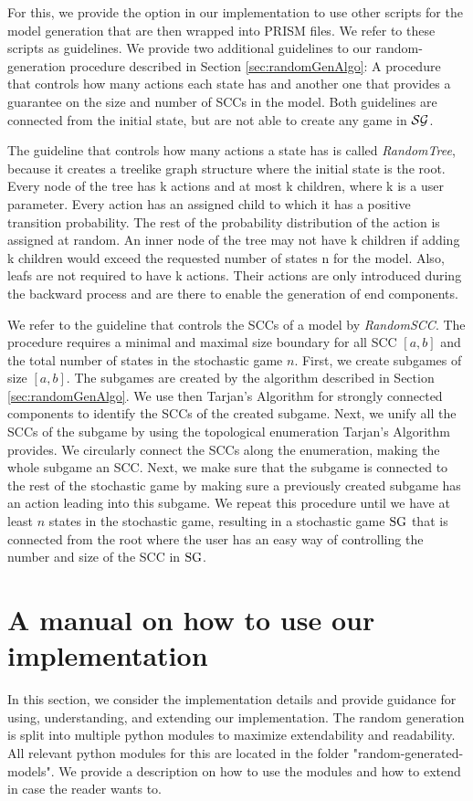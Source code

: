 For this, we provide the option in our implementation to use other scripts for the model generation that are then wrapped into PRISM files. We refer to these scripts as guidelines.
We provide two additional guidelines to our random-generation procedure described in Section \ref{sec:randomGenAlgo}: 
A procedure that controls how many actions each state has and another one that provides a guarantee on the size and number of SCCs in the model.
Both guidelines are connected from the initial state, but are not able to create any game in $\mathcal{SG}$.

The guideline that controls how many actions a state has is called \emph{RandomTree}, 
because it creates a treelike graph structure where the initial state is the root.
Every node of the tree has k actions and at most k children, where k is a user parameter. 
Every action has an assigned child to which it has a positive transition probability.
The rest of the probability distribution of the action is assigned at random.
An inner node of the tree may not have k children if adding k children would exceed the requested number of states n for the model.
Also, leafs are not required to have k actions.
Their actions are only introduced during the backward process and are there to enable the generation of end components.

We refer to the guideline that controls the SCCs of a model by \emph{RandomSCC}.
The procedure requires a minimal and maximal size boundary for all SCC $[a, b]$ and the total number of states in the stochastic game $n$.
First, we create subgames of size $[a,b]$.
The subgames are created by the algorithm described in Section \ref{sec:randomGenAlgo}.
We use then Tarjan's Algorithm for strongly connected components to identify the SCCs of the created subgame.
Next, we unify all the SCCs of the subgame by using the topological enumeration Tarjan's Algorithm provides.
We circularly connect the SCCs along the enumeration, making the whole subgame an SCC.
Next, we make sure that the subgame is connected to the rest of the stochastic game by making sure a previously created subgame has an action
leading into this subgame. We repeat this procedure until we have at least $n$ states in the stochastic game, 
resulting in a stochastic game $\textrm{SG}$ that is connected from the root where the user has an easy way of controlling the number and size of the SCC in $\textrm{SG}$.

\section{A manual on how to use our implementation}
In this section, we consider the implementation details and provide guidance for using, understanding, and extending our implementation.
The random generation is split into multiple python modules to maximize extendability and readability.
All relevant python modules for this are located in the folder "random-generated-models".
We provide a description on how to use the modules and how to extend in case the reader wants to.

